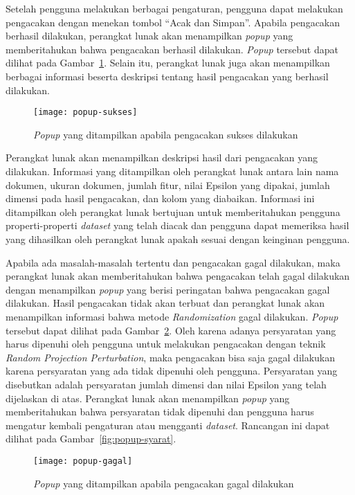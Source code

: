Setelah pengguna melakukan berbagai pengaturan, pengguna dapat melakukan pengacakan dengan menekan tombol \textquotedblleft Acak dan Simpan\textquotedblright. Apabila pengacakan berhasil dilakukan, perangkat lunak akan menampilkan \textit{popup} yang memberitahukan bahwa pengacakan berhasil dilakukan. \textit{Popup} tersebut dapat dilihat pada Gambar~\ref{fig:popup-sukses}. Selain itu, perangkat lunak juga akan menampilkan berbagai informasi beserta deskripsi tentang hasil pengacakan yang berhasil dilakukan.

\begin{figure}
	\centering
	\texttt{[image: popup-sukses]}
	\caption{\textit{Popup} yang ditampilkan apabila pengacakan sukses dilakukan}
	\label{fig:popup-sukses}
\end{figure}

Perangkat lunak akan menampilkan deskripsi hasil dari pengacakan yang dilakukan. Informasi yang ditampilkan oleh perangkat lunak antara lain nama dokumen, ukuran dokumen, jumlah fitur, nilai Epsilon yang dipakai, jumlah dimensi pada hasil pengacakan, dan kolom yang diabaikan. Informasi ini ditampilkan oleh perangkat lunak bertujuan untuk memberitahukan pengguna properti-properti \textit{dataset} yang telah diacak dan pengguna dapat memeriksa hasil yang dihasilkan oleh perangkat lunak apakah sesuai dengan keinginan pengguna.

Apabila ada masalah-masalah tertentu dan pengacakan gagal dilakukan, maka perangkat lunak akan memberitahukan bahwa pengacakan telah gagal dilakukan dengan menampilkan \textit{popup} yang berisi peringatan bahwa pengacakan gagal dilakukan. Hasil pengacakan tidak akan terbuat dan perangkat lunak akan menampilkan informasi bahwa metode \textit{Randomization} gagal dilakukan. \textit{Popup} tersebut dapat dilihat pada Gambar~\ref{fig:popup-gagal}. Oleh karena adanya persyaratan yang harus dipenuhi oleh pengguna untuk melakukan pengacakan dengan teknik \textit{Random Projection Perturbation}, maka pengacakan bisa saja gagal dilakukan karena persyaratan yang ada tidak dipenuhi oleh pengguna. Persyaratan yang disebutkan adalah persyaratan jumlah dimensi dan nilai Epsilon yang telah dijelaskan di atas. Perangkat lunak akan menampilkan \textit{popup} yang memberitahukan bahwa persyaratan tidak dipenuhi dan pengguna harus mengatur kembali pengaturan atau mengganti \textit{dataset}. Rancangan ini dapat dilihat pada Gambar~\ref{fig:popup-syarat}.

\begin{figure}
	\centering
	\texttt{[image: popup-gagal]}
	\caption{\textit{Popup} yang ditampilkan apabila pengacakan gagal dilakukan}
	\label{fig:popup-gagal}
\end{figure}

